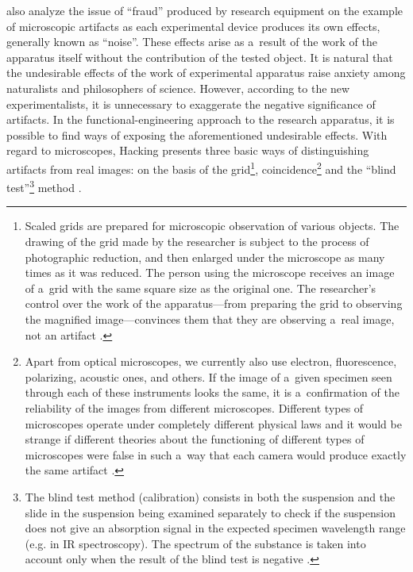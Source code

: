  also analyze the issue of ``fraud'' produced by research equipment on the example of microscopic artifacts as each experimental device produces its own effects, generally known as ``noise''. These effects arise as a~result of the work of the apparatus itself without the contribution of the tested object. It is natural that the undesirable effects of the work of experimental apparatus raise anxiety among naturalists and philosophers of science. However, according to the new experimentalists, it is unnecessary to exaggerate the negative significance of artifacts. In the functional-engineering approach to the research apparatus, it is possible to find ways of exposing the aforementioned undesirable effects. With regard to microscopes, Hacking presents three basic ways of distinguishing artifacts from real images: on the basis of the grid\footnote{Scaled grids are prepared for microscopic observation of various objects. The drawing of the grid made by the researcher is subject to the process of photographic reduction, and then enlarged under the microscope as many times as it was reduced. The person using the microscope receives an image of a~grid with the same square size as the original one. The researcher's control over the work of the apparatus\textrm{---}from preparing the grid to observing the magnified image---convinces them that they are observing a~real image, not an artifact 
\parencite[][]{churchland_we_1985}. %
 }, coincidence\footnote{Apart from optical microscopes, we currently also use electron, fluorescence, polarizing, acoustic ones, and others. If the image of a~given specimen seen through each of these instruments looks the same, it is a~confirmation of the reliability of the images from different microscopes. Different types of microscopes operate under completely different physical laws and it would be strange if different theories about the functioning of different types of microscopes were false in such a~way that each camera would produce exactly the same artifact 
\parencite[][]{churchland_we_1985}.%
} and the ``blind test''\footnote{The blind test method (calibration) consists in both the suspension and the slide in the suspension being examined separately to check if the suspension does not give an absorption signal in the expected specimen wavelength range (e.g. in IR spectroscopy). The spectrum of the substance is taken into account only when the result of the blind test is negative 
\parencite[][]{franklin_neglect_1986}.%
} method 
\parencite[][pp.145–151]{churchland_we_1985}.%




